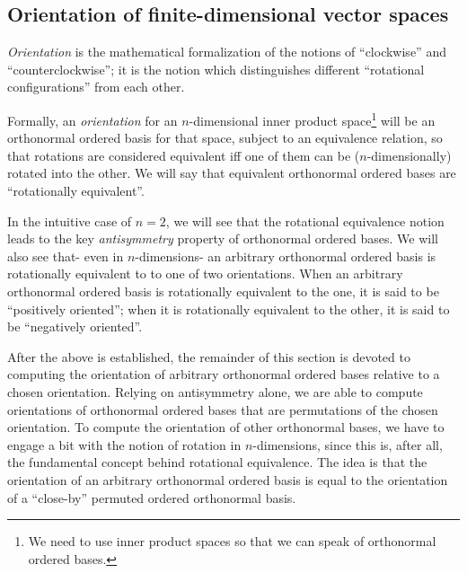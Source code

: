 \newpage

\subsection*{Orientation of finite-dimensional vector spaces}
\label{ch::lin_alg::section::orientation}

\textit{Orientation} is the mathematical formalization of the notions of ``clockwise'' and ``counterclockwise''; it is the notion which distinguishes different ``rotational configurations'' from each other.

Formally, an \textit{orientation} for an $n$-dimensional inner product space\footnote{We need to use inner product spaces so that we can speak of orthonormal ordered bases.} will be an orthonormal ordered basis for that space, subject to an equivalence relation, so that rotations are considered equivalent iff one of them can be ($n$-dimensionally) rotated into the other. We will say that equivalent orthonormal ordered bases are ``rotationally equivalent''.

In the intuitive case of $n = 2$, we will see that the rotational equivalence notion leads to the key \textit{antisymmetry} property of orthonormal ordered bases. We will also see that- even in $n$-dimensions- an arbitrary orthonormal ordered basis is rotationally equivalent to to one of two orientations. When an arbitrary orthonormal ordered basis is rotationally equivalent to the one, it is said to be ``positively oriented''; when it is rotationally equivalent to the other, it is said to be ``negatively oriented''.

After the above is established, the remainder of this section is devoted to computing the orientation of arbitrary orthonormal ordered bases relative to a chosen orientation. Relying on antisymmetry alone, we are able to compute orientations of orthonormal ordered bases that are permutations of the chosen orientation. To compute the orientation of other orthonormal bases, we have to engage a bit with the notion of rotation in $n$-dimensions, since this is, after all, the fundamental concept behind rotational equivalence. The idea is that the orientation of an arbitrary orthonormal ordered basis is equal to the orientation of a ``close-by'' permuted ordered orthonormal basis.

